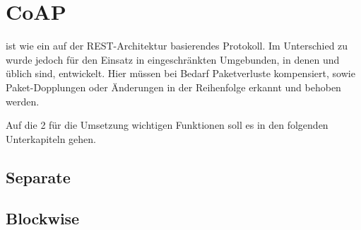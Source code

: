 \chapter{CoAP}
\label{chp:coap}

 ist wie  ein auf der REST-Architektur basierendes Protokoll. Im Unterschied zu  wurde
 jedoch für den Einsatz in eingeschränkten Umgebunden, in denen  und  üblich sind, entwickelt.
Hier müssen bei Bedarf Paketverluste kompensiert, sowie Paket-Dopplungen oder Änderungen in der Reihenfolge erkannt und behoben werden.


Auf die 2 für die Umsetzung wichtigen Funktionen soll es in den folgenden Unterkapiteln gehen.

\section{Separate}
\label{chp:coap-separate}

\section{Blockwise}
\label{chp:coap-blockwise}